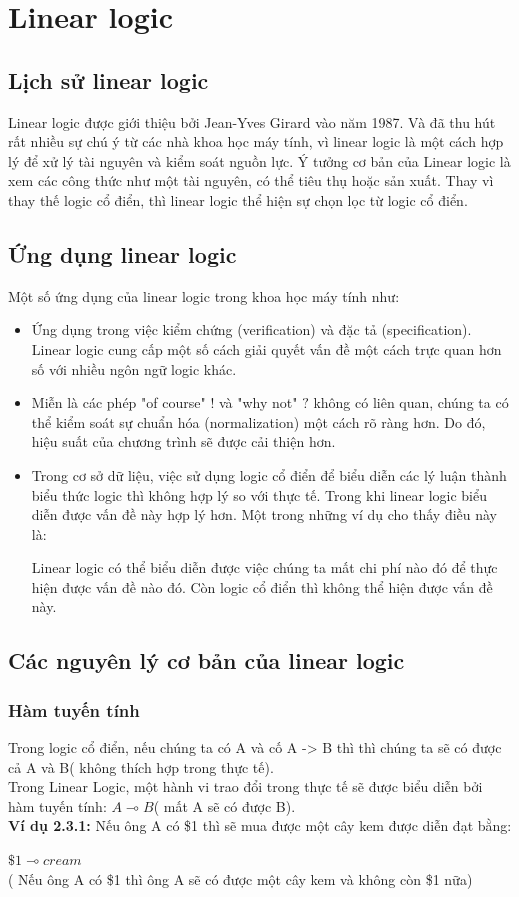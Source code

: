 \documentclass[12pt,a4paper,oneside]{article}
\begin{document}
\section{Linear logic}
\subsection{Lịch sử linear logic}
 Linear logic được giới thiệu bởi Jean-Yves Girard vào năm 1987. Và đã thu hút rất nhiều sự chú ý từ các nhà khoa học máy tính, vì linear logic là một cách hợp lý để xử lý tài nguyên và kiểm soát nguồn lực. Ý tưởng cơ bản của Linear logic là xem các công thức như một tài nguyên, có thể tiêu thụ hoặc sản xuất. Thay vì thay thế logic cổ điển, thì linear logic thể hiện sự chọn lọc từ logic cổ điển.
 

\subsection{Ứng dụng linear logic}
Một số ứng dụng của linear logic trong khoa học máy tính như:
\begin{itemize}
	\item Ứng dụng trong việc kiểm chứng (verification) và đặc tả (specification). Linear logic cung cấp một số cách giải quyết vấn đề một cách trực quan hơn số với nhiều ngôn ngữ logic khác.
	\item Miễn là các phép "of course" $!$ và "why not" $?$  không có liên quan, chúng ta có thể kiểm soát sự chuẩn hóa (normalization) một cách rõ ràng hơn. Do đó, hiệu suất của chương trình sẽ được cải thiện hơn.
	\item Trong cơ sở dữ liệu, việc sử dụng logic cổ điển để biểu diễn các lý luận thành biểu thức logic thì không hợp lý so với thực tế. Trong khi linear logic biểu diễn được vấn đề này hợp lý hơn. Một trong những ví dụ cho thấy điều này là:\par
	Linear logic có thể biểu diễn được việc chúng ta mất chi phí nào đó để thực hiện được vấn đề nào đó. Còn logic cổ điển thì không thể hiện được vấn đề này.
\end{itemize}

\subsection{Các nguyên lý cơ bản của linear logic}
\subsubsection{Hàm tuyến tính}
Trong logic cổ điển, nếu chúng ta có A và cố A -> B thì thì chúng ta sẽ có được cả A và B( không thích hợp trong thực tế). \\
Trong Linear Logic, một hành vi trao đổi trong thực tế sẽ được biểu diễn bởi hàm tuyến tính: $A \multimap B $( mất A sẽ có được B).\\
\textbf{Ví dụ 2.3.1: } Nếu ông A có \$1 thì sẽ mua được một cây kem được diễn đạt bằng:\\
\begin{center}
	$\$1 \multimap cream$ \\
	( Nếu ông A có \$1 thì ông A sẽ có được một cây kem và không còn \$1 nữa)
\end{center}
\end{document}
